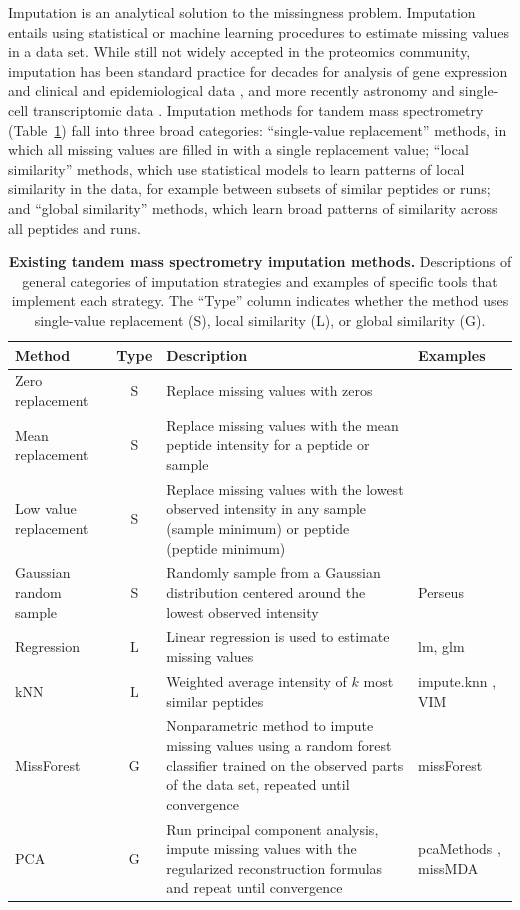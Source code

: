 \documentclass{article}
\begin{document}
Imputation is an analytical solution to the missingness problem. Imputation entails using statistical or machine learning procedures to estimate missing values in a data set. While still not widely accepted in the proteomics community, imputation has been standard practice for decades for analysis of gene expression \cite{knn-impute} and clinical and epidemiological data \cite{multi-impute-clinical}, and more recently astronomy \cite{astro-impute1, astro-impute2} and single-cell transcriptomic data \cite{ALRA, magic-scRNA}. Imputation methods for tandem mass spectrometry (Table~\ref{tab:method-descrip}) fall into three broad categories: ``single-value replacement'' methods, in which all missing values are filled in with a single replacement value; ``local similarity'' methods, which use statistical models to learn patterns of local similarity in the data, for example between subsets of similar peptides or runs; and ``global similarity'' methods, which learn broad patterns of similarity across all peptides and runs.

\begin{table}
  \scriptsize
  \centering
  \begin{tabular}{lcp{3in}p{1in}}
    \hline
    Method & Type & Description & Examples \\
    \hline
    Zero replacement & S & Replace missing values with zeros & \\
    Mean replacement & S & Replace missing values with the mean peptide intensity for a peptide or sample & \\
    Low value replacement & S & Replace missing values with the lowest observed intensity in any sample (sample minimum) or peptide (peptide minimum) & \\
    Gaussian random sample & S & Randomly sample from a Gaussian distribution centered around the lowest observed intensity & Perseus \cite{Perseus} \\
    Regression & L & Linear regression is used to estimate missing values & lm, glm \\
   kNN & L & Weighted average intensity of $k$ most similar peptides & impute.knn \cite{knn-impute}, VIM \cite{VIM} \\
    MissForest & G & Nonparametric method to impute missing values
using a random forest classifier trained on the observed parts of the data set,
repeated until convergence & missForest \cite{missForest} \\
    PCA & G & Run principal component analysis, impute missing values with the regularized reconstruction formulas and repeat until convergence & pcaMethods \cite{pcaMethods}, missMDA \cite{missMDA} \\
     \hline
  \end{tabular}
  \caption{{\bf Existing tandem mass spectrometry imputation methods.} Descriptions of general categories of imputation strategies and examples of specific tools that implement each strategy.  The ``Type'' column indicates whether the method uses single-value replacement (S), local similarity (L), or global similarity (G).
    \label{tab:method-descrip}}
\end{table}
\end{document}
